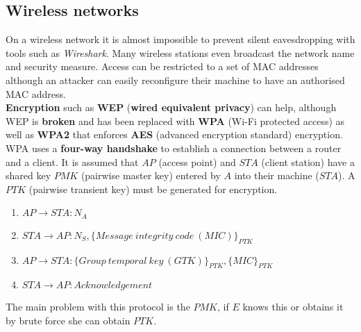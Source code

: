 \documentclass[final]{article}
\newcommand{\np}{\vspace{8pt} \\}
\begin{document}
\subsection{Wireless networks}
On a wireless network it is almost impossible to prevent silent eavesdropping with tools such as \textit{Wireshark}. Many wireless stations even broadcast the network name and security measure. Access can be restricted to a set of MAC addresses although an attacker can easily reconfigure their machine to have an authorised MAC address. \np
\textbf{Encryption} such as \textbf{WEP} (\textbf{wired equivalent privacy}) can help, although WEP is \textbf{broken} and has been replaced with \textbf{WPA} (Wi-Fi protected access) as well as \textbf{WPA2} that enforces \textbf{AES} (advanced encryption standard) encryption. WPA uses a \textbf{four-way handshake} to establish a connection between a router and a client. It is assumed that $ AP $ (access point) and $ STA $ (client station) have a shared key $ PMK $ (pairwise master key) entered by $ A $ into their machine ($ STA $). A $ PTK $ (pairwise transient key) must be generated for encryption.
\begin{enumerate}
	\item $ AP \rightarrow STA : N_{A} $
	\item $ STA \rightarrow AP : N_{S}, \{ Message\ integrity\ code\ (MIC) \}_{PTK} $
	\item $ AP \rightarrow STA : \{ Group\ temporal\ key\ (GTK) \}_{PTK}, \{ MIC \}_{PTK} $
	\item $ STA \rightarrow AP : Acknowledgement $
\end{enumerate}
The main problem with this protocol is the $ PMK $, if $ E $ knows this or obtains it by brute force she can obtain $ PTK $.
\end{document}

